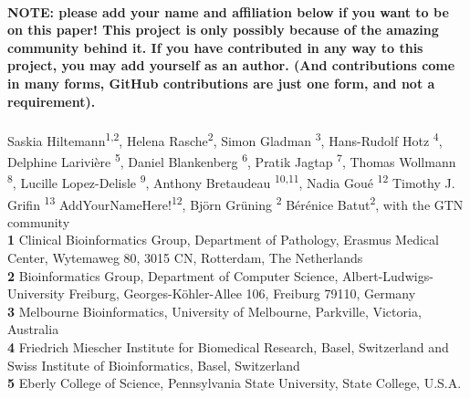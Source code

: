 \documentclass[10pt,letterpaper]{article}
\begin{document}
\vspace*{0.2in}

\begin{flushleft}
{\Large
\textbf{} %
}
\newline
\\
\color{blue} \textbf{NOTE: please add your name and affiliation below if you want to be on this paper! This project is only possibly because of the amazing community behind it. If you have contributed in any way to this project, you may add yourself as an author. (And contributions come in many forms, GitHub contributions are just one form, and not a requirement). } \\
\color{black}
\ \\
Saskia Hiltemann\textsuperscript{1,2\Yinyang\textpilcrow},
Helena Rasche\textsuperscript{2\Yinyang},
Simon Gladman \textsuperscript{3},
Hans-Rudolf Hotz \textsuperscript{4},
Delphine Larivière \textsuperscript{5},
Daniel Blankenberg \textsuperscript{6},
Pratik Jagtap \textsuperscript{7},
Thomas Wollmann \textsuperscript{8},
Lucille Lopez-Delisle \textsuperscript{9},
Anthony Bretaudeau \textsuperscript{10,11},
Nadia Goué \textsuperscript{12}
Timothy J. Grifin \textsuperscript{13}
\color{blue}AddYourNameHere!\textsuperscript{12}\color{black},
Björn Grüning \textsuperscript{2\ddag}
Bérénice Batut\textsuperscript{2\ddag},
with the GTN community
\\
\bigskip
\textbf{1} Clinical Bioinformatics Group, Department of Pathology, Erasmus Medical Center, Wytemaweg 80, 3015 CN, Rotterdam, The Netherlands \\
\textbf{2} Bioinformatics Group, Department of Computer Science, Albert-Ludwigs-University Freiburg, Georges-Köhler-Allee 106, Freiburg 79110, Germany \\
\textbf{3} Melbourne Bioinformatics, University of Melbourne, Parkville, Victoria, Australia \\
\textbf{4} Friedrich Miescher Institute for Biomedical Research, Basel, Switzerland and Swiss Institute of Bioinformatics, Basel, Switzerland \\
\textbf{5} Eberly College of Science, Pennsylvania State University, State College, U.S.A. \\

\end{flushleft}
\end{document}
